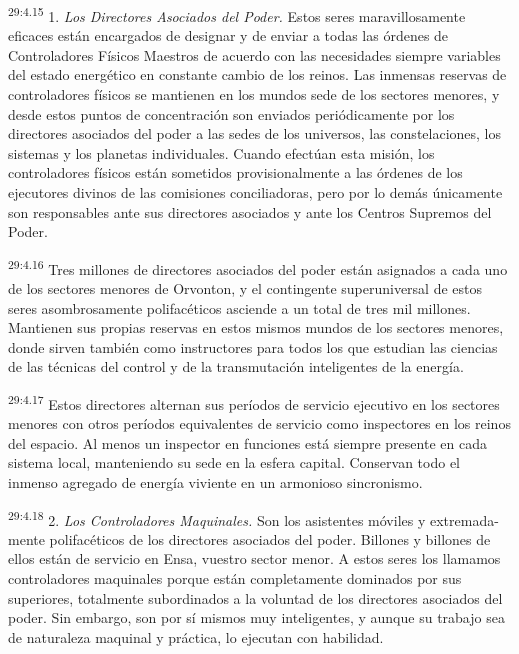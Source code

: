 \par
\textsuperscript{29:4.15} 1. \textit{Los Directores Asociados del Poder.} Estos seres maravillosamente eficaces están encargados de designar y de enviar a todas las órdenes de Controladores Físicos Maestros de acuerdo con las necesidades siempre variables del estado energético en constante cambio de los reinos. Las inmensas reservas de controladores físicos se mantienen en los mundos sede de los sectores menores, y desde estos puntos de concentración son enviados periódicamente por los directores asociados del poder a las sedes de los universos, las constelaciones, los sistemas y los planetas individuales. Cuando efectúan esta misión, los controladores físicos están sometidos provisionalmente a las órdenes de los ejecutores divinos de las comisiones conciliadoras, pero por lo demás únicamente son responsables ante sus directores asociados y ante los Centros Supremos del Poder.

\par
\textsuperscript{29:4.16} Tres millones de directores asociados del poder están asignados a cada uno de los sectores menores de Orvonton, y el contingente superuniversal de estos seres asombrosamente polifacéticos asciende a un total de tres mil millones. Mantienen sus propias reservas en estos mismos mundos de los sectores menores, donde sirven también como instructores para todos los que estudian las ciencias de las técnicas del control y de la transmutación inteligentes de la energía.

\par
\textsuperscript{29:4.17} Estos directores alternan sus períodos de servicio ejecutivo en los sectores menores con otros períodos equivalentes de servicio como inspectores en los reinos del espacio. Al menos un inspector en funciones está siempre presente en cada sistema local, manteniendo su sede en la esfera capital. Conservan todo el inmenso agregado de energía viviente en un armonioso sincronismo.

\par
\textsuperscript{29:4.18} 2. \textit{Los Controladores Maquinales.} Son los asistentes móviles y extremada-mente polifacéticos de los directores asociados del poder. Billones y billones de ellos están de servicio en Ensa, vuestro sector menor. A estos seres los llamamos controladores maquinales porque están completamente dominados por sus superiores, totalmente subordinados a la voluntad de los directores asociados del poder. Sin embargo, son por sí mismos muy inteligentes, y aunque su trabajo sea de naturaleza maquinal y práctica, lo ejecutan con habilidad.

